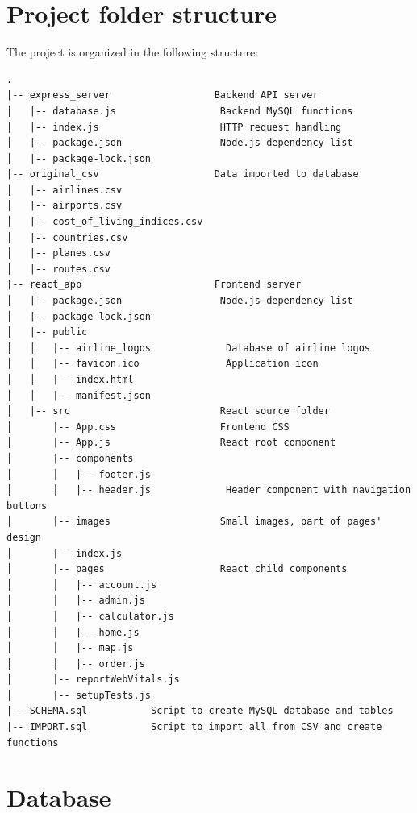 \documentclass[12pt]{article}
\begin{document}
\section{Project folder structure}
\label{sec:orgca5210d}
The project is organized in the following structure:
\begin{verbatim}
.
|-- express_server                  Backend API server
│   |-- database.js                  Backend MySQL functions
│   |-- index.js                     HTTP request handling
│   |-- package.json                 Node.js dependency list
│   |-- package-lock.json                
|-- original_csv                    Data imported to database
│   |-- airlines.csv                                                            
│   |-- airports.csv
│   |-- cost_of_living_indices.csv
│   |-- countries.csv
│   |-- planes.csv
│   |-- routes.csv                   
|-- react_app                       Frontend server
│   |-- package.json                 Node.js dependency list
│   |-- package-lock.json
│   |-- public                        
│   │   |-- airline_logos             Database of airline logos
│   │   |-- favicon.ico               Application icon
│   │   |-- index.html
│   │   |-- manifest.json
│   |-- src                          React source folder
│       |-- App.css                  Frontend CSS
│       |-- App.js                   React root component
│       |-- components                
│       │   |-- footer.js            
│       │   |-- header.js             Header component with navigation buttons
│       |-- images                   Small images, part of pages' design
│       |-- index.js                 
│       |-- pages                    React child components
│       │   |-- account.js
│       │   |-- admin.js
│       │   |-- calculator.js
│       │   |-- home.js
│       │   |-- map.js
│       │   |-- order.js
│       |-- reportWebVitals.js
│       |-- setupTests.js
|-- SCHEMA.sql           Script to create MySQL database and tables
|-- IMPORT.sql           Script to import all from CSV and create functions
\end{verbatim}

\section{Database}
\label{sec:org47b529a}
\end{document}

